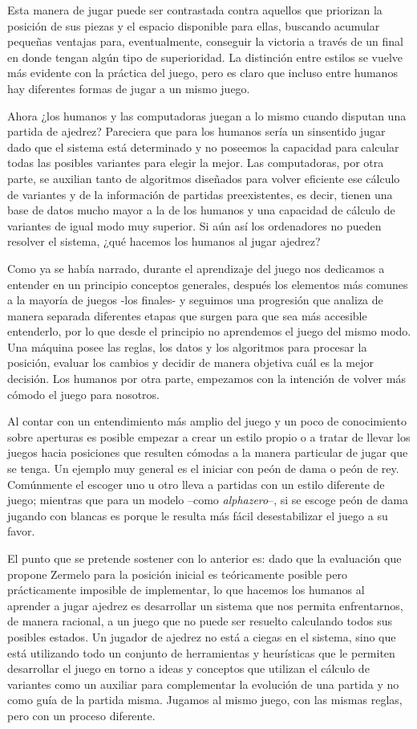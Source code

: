 \documentclass[twoside,openright,12pt,a4paper,spanish]{book}
\begin{document}
Esta manera de jugar puede ser contrastada contra aquellos que priorizan la posici\'on de sus piezas y el espacio disponible para ellas, buscando acumular peque\~nas ventajas para, eventualmente, conseguir la victoria a trav\'es de un final en donde tengan alg\'un tipo de superioridad. La distinci\'on entre estilos se vuelve m\'as evidente con la pr\'actica del juego, pero es claro que incluso entre humanos hay diferentes formas de jugar a un mismo juego. 

Ahora ¿los humanos y las computadoras juegan a lo mismo cuando disputan una partida de ajedrez? Pareciera que para los humanos sería un sinsentido jugar dado que el sistema está determinado y no poseemos la capacidad para calcular todas las posibles variantes para elegir la mejor. Las computadoras, por otra parte, se auxilian tanto de algoritmos diseñados para volver eficiente ese cálculo de variantes y de la información de partidas preexistentes, es decir, tienen una base de datos mucho mayor a la de los humanos y una capacidad de cálculo de variantes de igual modo muy superior. Si aún así los ordenadores no pueden resolver el sistema, ¿qué hacemos los humanos al jugar ajedrez? 

Como ya se había narrado, durante el aprendizaje del juego nos dedicamos a entender en un principio conceptos generales, después los elementos más comunes a la mayoría de juegos -los finales- y seguimos una progresión que analiza de manera separada diferentes etapas que surgen para que sea más accesible entenderlo, por lo que desde el principio no aprendemos el juego del mismo modo. Una máquina posee las reglas, los datos y los algoritmos para procesar la posición, evaluar los cambios y decidir de manera objetiva cuál es la mejor decisión. Los humanos por otra parte, empezamos con la intención de volver más cómodo el juego para nosotros. 

Al contar con un entendimiento más amplio del juego y un poco de conocimiento sobre aperturas es posible empezar a crear un estilo propio o a tratar de llevar los juegos hacia posiciones que resulten cómodas a la manera particular de jugar que se tenga. Un ejemplo muy general es el iniciar con peón de dama o peón de rey. Comúnmente el escoger uno u otro lleva a partidas con un estilo diferente de juego; mientras que para un modelo --como \emph{alphazero}--, si se escoge peón de dama jugando con blancas es porque le resulta más fácil desestabilizar el juego a su favor.

El punto que se pretende sostener con lo anterior es: dado que la evaluación que propone Zermelo para la posición inicial es teóricamente posible pero prácticamente imposible de implementar, lo que hacemos los humanos al aprender a jugar ajedrez es desarrollar un sistema que nos permita enfrentarnos, de manera racional, a un juego que no puede ser resuelto calculando todos sus posibles estados. Un jugador de ajedrez no está a ciegas en el sistema, sino que está utilizando todo un conjunto de herramientas y heurísticas que le permiten desarrollar el juego en torno a ideas y conceptos que utilizan el cálculo de variantes como un auxiliar para complementar la evolución de una partida y no como guía de la partida misma. Jugamos al mismo juego, con las mismas reglas, pero con un proceso diferente.
\end{document}
